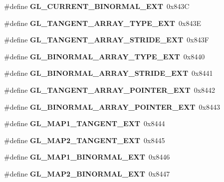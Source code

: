 \begin{DoxyCompactItemize}
\item 
\#define {\bfseries G\+L\+\_\+\+C\+U\+R\+R\+E\+N\+T\+\_\+\+B\+I\+N\+O\+R\+M\+A\+L\+\_\+\+E\+X\+T}~0x843\+C\label{_s_d_l__opengl_8h_ac013c2f179cee5666d01dc0868f78bf9}

\item 
\#define {\bfseries G\+L\+\_\+\+T\+A\+N\+G\+E\+N\+T\+\_\+\+A\+R\+R\+A\+Y\+\_\+\+T\+Y\+P\+E\+\_\+\+E\+X\+T}~0x843\+E\label{_s_d_l__opengl_8h_a184aae825f7d4b33d940c26eae506514}

\item 
\#define {\bfseries G\+L\+\_\+\+T\+A\+N\+G\+E\+N\+T\+\_\+\+A\+R\+R\+A\+Y\+\_\+\+S\+T\+R\+I\+D\+E\+\_\+\+E\+X\+T}~0x843\+F\label{_s_d_l__opengl_8h_aebe4e26601710483a123faca44bedf42}

\item 
\#define {\bfseries G\+L\+\_\+\+B\+I\+N\+O\+R\+M\+A\+L\+\_\+\+A\+R\+R\+A\+Y\+\_\+\+T\+Y\+P\+E\+\_\+\+E\+X\+T}~0x8440\label{_s_d_l__opengl_8h_a61b1c6db5bda6f4d2b97d6a6c1b8b7e7}

\item 
\#define {\bfseries G\+L\+\_\+\+B\+I\+N\+O\+R\+M\+A\+L\+\_\+\+A\+R\+R\+A\+Y\+\_\+\+S\+T\+R\+I\+D\+E\+\_\+\+E\+X\+T}~0x8441\label{_s_d_l__opengl_8h_a19745b108056b9cf6b1c871bd2b8c374}

\item 
\#define {\bfseries G\+L\+\_\+\+T\+A\+N\+G\+E\+N\+T\+\_\+\+A\+R\+R\+A\+Y\+\_\+\+P\+O\+I\+N\+T\+E\+R\+\_\+\+E\+X\+T}~0x8442\label{_s_d_l__opengl_8h_ac235b4e03754dd3f0821aaab648f459c}

\item 
\#define {\bfseries G\+L\+\_\+\+B\+I\+N\+O\+R\+M\+A\+L\+\_\+\+A\+R\+R\+A\+Y\+\_\+\+P\+O\+I\+N\+T\+E\+R\+\_\+\+E\+X\+T}~0x8443\label{_s_d_l__opengl_8h_aaeb8c26a9ac4deb2f0c85ebc72f3a246}

\item 
\#define {\bfseries G\+L\+\_\+\+M\+A\+P1\+\_\+\+T\+A\+N\+G\+E\+N\+T\+\_\+\+E\+X\+T}~0x8444\label{_s_d_l__opengl_8h_a10c45c2b23bc4c0ed4b47a4de4294349}

\item 
\#define {\bfseries G\+L\+\_\+\+M\+A\+P2\+\_\+\+T\+A\+N\+G\+E\+N\+T\+\_\+\+E\+X\+T}~0x8445\label{_s_d_l__opengl_8h_ac64fa80b18ad1f5ef2c618adacf6a000}

\item 
\#define {\bfseries G\+L\+\_\+\+M\+A\+P1\+\_\+\+B\+I\+N\+O\+R\+M\+A\+L\+\_\+\+E\+X\+T}~0x8446\label{_s_d_l__opengl_8h_a792b15dc5376e1b3ae33fbf8ee9248bd}

\item 
\#define {\bfseries G\+L\+\_\+\+M\+A\+P2\+\_\+\+B\+I\+N\+O\+R\+M\+A\+L\+\_\+\+E\+X\+T}~0x8447\label{_s_d_l__opengl_8h_a61d6839eb30ea52d7277cfa1c333246e}


\end{DoxyCompactItemize}

